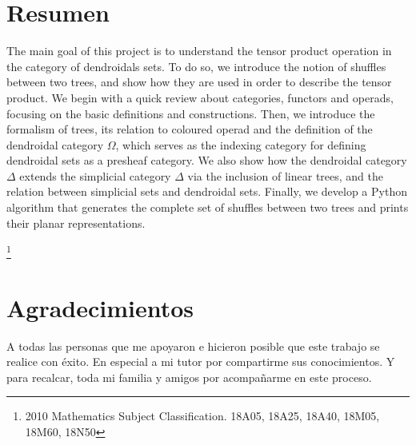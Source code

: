 \documentclass[11pt,a4paper,openright,oneside]{article}
\numberwithin{equation}{section}
\theoremstyle{definition}
\begin{document}


\section*{Resumen}
The main goal of this project is to understand the tensor product operation in the category of dendroidals sets.
To do so, we introduce the notion of shuffles between two trees, and show how they are used in order to describe the tensor product.
We begin with a quick review about categories, functors and operads, focusing on the basic definitions and constructions.
Then, we introduce the formalism of trees, its relation to coloured operad and the definition of the dendroidal category $\Omega$, which serves as the indexing category for defining dendroidal sets as a presheaf category.
We also show how the dendroidal category $\Delta$ extends the simplicial category $\Delta$ via the inclusion of linear trees, and the relation between simplicial sets and dendroidal sets.
Finally, we develop a Python algorithm that generates the complete set of shuffles between two trees and prints their planar representations.

 {\let\thefootnote\relax\footnote{2010 Mathematics Subject Classification. 18A05, 18A25, 18A40, 18M05, 18M60, 18N50}}
\newpage


\section*{Agradecimientos}
A todas las personas que me apoyaron e hicieron posible que este trabajo se realice con \'exito.
En especial a mi tutor por compartirme sus conocimientos.
Y para recalcar, toda mi familia y amigos por acompa\~narme en este proceso.

\newpage


\tableofcontents
\newpage
\end{document}
